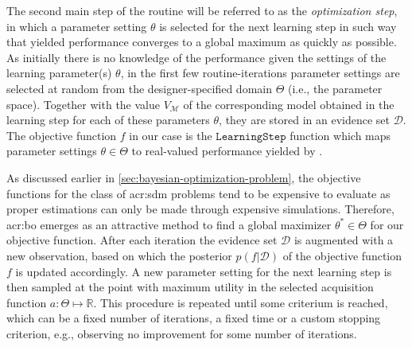The second main step of the routine will be referred to as the \textit{optimization step}, in which a parameter setting $\theta$ is selected for the next learning step in such way that yielded performance converges to a global maximum as quickly as possible.
As initially there is no knowledge of the performance given the settings of the learning parameter(s) $\theta$, in the first few routine-iterations parameter settings are selected at random from the designer-specified domain $\Theta$ (i.e., the parameter space).
Together with the value $V_{\mathcal{M}}$ of the corresponding model obtained in the learning step for each of these parameters $\theta$, they are stored in an evidence set $\mathcal{D}$.
The objective function $f$ in our case is the $\texttt{LearningStep}$ function which maps parameter settings $\theta \in \Theta$ to real-valued performance yielded by .

As discussed earlier in  \autoref{sec:bayesian-optimization-problem}, the objective functions for the class of \acrshort{acr:sdm} problems tend to be expensive to evaluate as proper estimations can only be made through expensive simulations.
Therefore, \acrlong{acr:bo} emerges as an attractive method to find a global maximizer $\theta^\ast \in \Theta$ for our objective function.
After each iteration the evidence set $\mathcal{D}$ is augmented with a new observation, based on which the posterior $p(f\vert \mathcal{D})$ of the objective function $f$ is updated accordingly.
A new parameter setting for the next learning step is then sampled at the point with maximum utility in the selected acquisition function $a: \Theta \mapsto \mathbb{R}$.
This procedure is repeated until some criterium is reached, which can be a fixed number of iterations, a fixed time or a custom stopping criterion, e.g., observing no improvement for some number of iterations.


